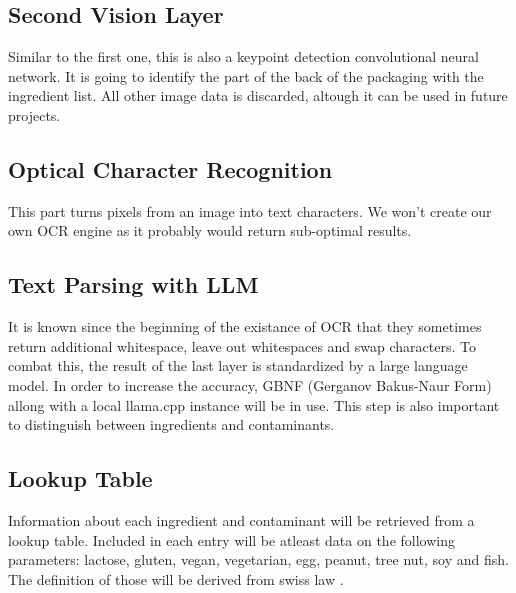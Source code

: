 \documentclass[a4paper,11pt]{report}
\begin{document}
            \subsection{Second Vision Layer}
                Similar to the first one, this is also a keypoint detection convolutional neural network.
                It is going to identify the part of the back of the packaging with the ingredient list. All other image data is discarded, altough it can be used in future projects.

            \subsection{Optical Character Recognition}
                This part turns pixels from an image into text characters. We won't create our own OCR engine as it probably would return sub-optimal results.

            \subsection{Text Parsing with LLM}
                It is known since the beginning of the existance of OCR that they sometimes return additional whitespace, leave out whitespaces and swap characters. To combat this, the result of the last layer is standardized by a large language model. In order to increase the accuracy, GBNF (Gerganov Bakus-Naur Form) \cite{gbnf} allong with a local llama.cpp \cite{llamacpp} instance will be in use. This step is also important to distinguish between ingredients and contaminants.

            \subsection{Lookup Table}
                Information about each ingredient and contaminant will be retrieved from a lookup table. Included in each entry will be atleast data on the following parameters: lactose, gluten, vegan, vegetarian, egg, peanut, tree nut, soy and fish. The definition of those will be derived from swiss law \cite{fedlex-ingredient}.


    \printbibliography
\end{document}
